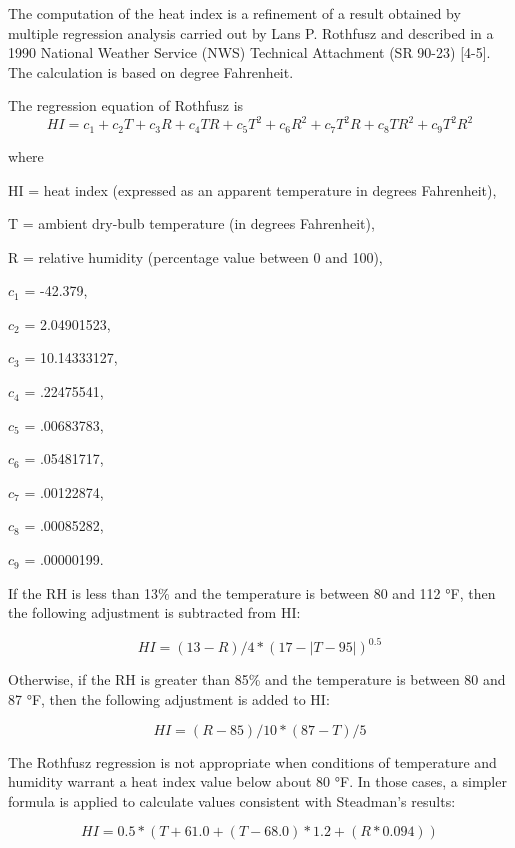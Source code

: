 The computation of the heat index is a refinement of a result obtained by multiple regression analysis carried out by Lans P. Rothfusz and described in a 1990 National Weather Service (NWS) Technical Attachment (SR 90-23) [4-5]. The calculation is based on degree Fahrenheit.

The regression equation of Rothfusz is
\begin{equation}  \label{eq:rm-1}
HI = c_1 + c_2T + c_3R + c_4TR + c_5T^2 + c_6R^2 + c_7T^2R + c_8TR^2 + c_9T^2R^2
\end{equation}

where

HI = heat index (expressed as an apparent temperature in degrees Fahrenheit),

T = ambient dry-bulb temperature (in degrees Fahrenheit),

R = relative humidity (percentage value between 0 and 100),

$c_1$ = -42.379,

$c_2$ = 2.04901523,

$c_3$ = 10.14333127,

$c_4$ = .22475541,

$c_5$ = .00683783,

$c_6$ = .05481717,

$c_7$ = .00122874,

$c_8$ = .00085282,

$c_9$ = .00000199.

If the RH is less than 13\% and the temperature is between 80 and 112 °F, then the following adjustment is subtracted from HI:

\begin{equation}  \label{eq:rm-2}
HI = (13 - R) / 4 * (17 - |T - 95|)^{0.5}
\end{equation}

Otherwise, if the RH is greater than 85\% and the temperature is between 80 and 87 °F, then the following adjustment is added to HI:

\begin{equation}  \label{eq:rm-3}
HI = (R - 85) / 10 * (87 - T) / 5
\end{equation}

The Rothfusz regression is not appropriate when conditions of temperature and humidity warrant a heat index value below about 80 °F. In those cases, a simpler formula is applied to calculate values consistent with Steadman's results:

\begin{equation}  \label{eq:rm-4}
HI = 0.5 * (T + 61.0 + (T - 68.0) * 1.2 + (R * 0.094))
\end{equation}

